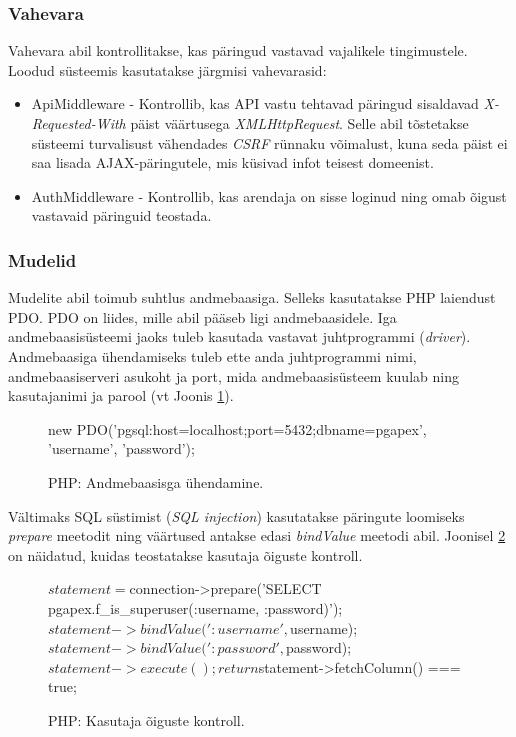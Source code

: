 \documentclass[a4paper,12pt]{article} %
\begin{document}
\subsubsection{Vahevara}
Vahevara abil kontrollitakse, kas päringud vastavad vajalikele tingimustele. Loodud süsteemis kasutatakse järgmisi vahevarasid:
\begin{itemize}
\item ApiMiddleware - Kontrollib, kas API vastu tehtavad päringud sisaldavad \textit{X-Requested-With} päist väärtusega \textit{XMLHttpRequest}. Selle abil tõstetakse süsteemi turvalisust vähendades \textit{CSRF} rünnaku võimalust, kuna seda päist ei saa lisada AJAX-päringutele, mis küsivad infot teisest domeenist.
\item AuthMiddleware - Kontrollib, kas arendaja on sisse loginud ning omab õigust vastavaid päringuid teostada.
\end{itemize}

\subsubsection{Mudelid}
Mudelite abil toimub suhtlus andmebaasiga. Selleks kasutatakse PHP laiendust PDO. PDO on liides, mille abil pääseb ligi andmebaasidele. Iga andmebaasisüsteemi jaoks tuleb kasutada vastavat juhtprogrammi (\textit{driver}). Andmebaasiga ühendamiseks tuleb ette anda juhtprogrammi nimi, andmebaasiserveri asukoht ja port, mida andmebaasisüsteem kuulab ning kasutajanimi ja parool (vt Joonis \ref{fig_andmebaasiga_ühendamine}). \cite{PDO}
\begin{figure}[H]
\centering
\begin{PHP}
new PDO('pgsql:host=localhost;port=5432;dbname=pgapex', 'username', 'password');
\end{PHP}
\caption{PHP: Andmebaasisga ühendamine.}
\label{fig_andmebaasiga_ühendamine}
\end{figure}
Vältimaks SQL süstimist (\textit{SQL injection}) kasutatakse päringute loomiseks \textit{prepare} meetodit ning väärtused antakse edasi \textit{bindValue} meetodi abil. Joonisel \ref{fig_php_kasutaja_õiguste_kontroll} on näidatud, kuidas teostatakse kasutaja õiguste kontroll.
 \begin{figure}[H]
\centering
\begin{PHP}
$statement = $connection->prepare('SELECT pgapex.f_is_superuser(:username, :password)');
$statement->bindValue(':username', $username);
$statement->bindValue(':password', $password);
$statement->execute();
return $statement->fetchColumn() === true;
\end{PHP}
\caption{PHP: Kasutaja õiguste kontroll.}
\label{fig_php_kasutaja_õiguste_kontroll}
\end{figure}
\end{document}
